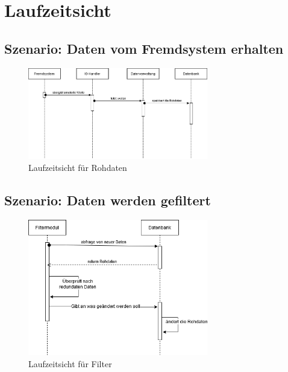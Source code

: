\chapter{Laufzeitsicht}
\label{ch:Laufzeitsicht}

\section{Szenario: Daten vom Fremdsystem erhalten}
\begin{figure}[tbh]
    \centering
    \includegraphics[width=0.7\textwidth]{Graphics/Laufzeit_Rohdaten.png}
    \caption{Laufzeitsicht für Rohdaten}
    \label{fig:LaufzeitRohdaten}
  \end{figure}

\section{Szenario: Daten werden gefiltert}
\begin{figure}[tbh]
    \centering
    \includegraphics[width=0.7\textwidth]{Graphics/Laufzeit_Filter.png}
    \caption{Laufzeitsicht für Filter}
    \label{fig:LaufzeitFilter}
  \end{figure}